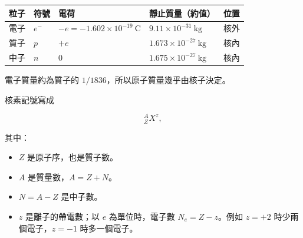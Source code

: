 \documentclass[11pt,a4paper]{article}
\newcounter{none}
\providecommand{\tightlist}{%
  \setlength{\itemsep}{0pt}\setlength{\parskip}{0pt}}
\begin{document}
{\def\LTcaptype{none} %
\begin{longtable}[]{@{}
  >{\raggedright\arraybackslash}p{}
  >{\raggedleft\arraybackslash}p{}
  >{\raggedleft\arraybackslash}p{}
  >{\raggedleft\arraybackslash}p{}
  >{\raggedright\arraybackslash}p{}@{}}
\toprule\noalign{}
\begin{minipage}[b]{\linewidth}\raggedright
粒子
\end{minipage} & \begin{minipage}[b]{\linewidth}\raggedleft
符號
\end{minipage} & \begin{minipage}[b]{\linewidth}\raggedleft
電荷
\end{minipage} & \begin{minipage}[b]{\linewidth}\raggedleft
靜止質量（約值）
\end{minipage} & \begin{minipage}[b]{\linewidth}\raggedright
位置
\end{minipage} \\
\midrule\noalign{}
\endhead
\bottomrule\noalign{}
\endlastfoot
電子 & \(e^-\) & \(-e=-1.602\times10^{-19}\ \mathrm C\) & \(9.11\times10^{-31}\ \mathrm{kg}\) & 核外 \\
質子 & \(p\) & \(+e\) & \(1.673\times10^{-27}\ \mathrm{kg}\) & 核內 \\
中子 & \(n\) & \(0\) & \(1.675\times10^{-27}\ \mathrm{kg}\) & 核內 \\
\end{longtable}
}

電子質量約為質子的 \(1/1836\)，所以原子質量幾乎由核子決定。

核素記號寫成

\[
{}^{A}_{Z}X^{z},
\]

其中：

\begin{itemize}
\tightlist
\item
  \(Z\) 是原子序，也是質子數。
\item
  \(A\) 是質量數，\(A=Z+N\)。
\item
  \(N=A-Z\) 是中子數。
\item
  \(z\) 是離子的帶電數；以 \(e\) 為單位時，電子數 \(N_e=Z-z\)。例如 \(z=+2\) 時少兩個電子，\(z=-1\) 時多一個電子。
\end{itemize}
\end{document}
